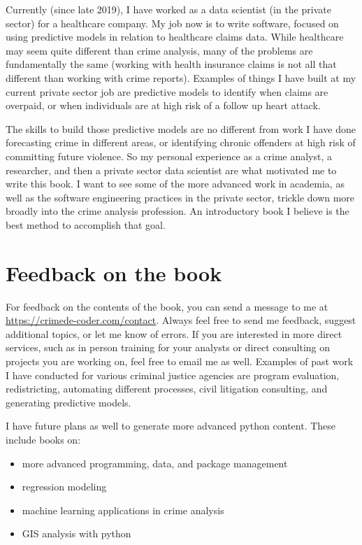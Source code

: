 \documentclass[
  letterpaper,
]{scrbook}
\providecommand{\tightlist}{%
  \setlength{\itemsep}{0pt}\setlength{\parskip}{0pt}}\usepackage{longtable,booktabs,array}
\begin{document}
Currently (since late 2019), I have worked as a data scientist (in the
private sector) for a healthcare company. My job now is to write
software, focused on using predictive models in relation to healthcare
claims data. While healthcare may seem quite different than crime
analysis, many of the problems are fundamentally the same (working with
health insurance claims is not all that different than working with
crime reports). Examples of things I have built at my current private
sector job are predictive models to identify when claims are overpaid,
or when individuals are at high risk of a follow up heart attack.

The skills to build those predictive models are no different from work I
have done forecasting crime in different areas, or identifying chronic
offenders at high risk of committing future violence. So my personal
experience as a crime analyst, a researcher, and then a private sector
data scientist are what motivated me to write this book. I want to see
some of the more advanced work in academia, as well as the software
engineering practices in the private sector, trickle down more broadly
into the crime analysis profession. An introductory book I believe is
the best method to accomplish that goal.

\section*{Feedback on the book}\label{feedback-on-the-book}


For feedback on the contents of the book, you can send a message to me
at \url{https://crimede-coder.com/contact}. Always feel free to send me
feedback, suggest additional topics, or let me know of errors. If you
are interested in more direct services, such as in person training for
your analysts or direct consulting on projects you are working on, feel
free to email me as well. Examples of past work I have conducted for
various criminal justice agencies are program evaluation, redistricting,
automating different processes, civil litigation consulting, and
generating predictive models.

I have future plans as well to generate more advanced python content.
These include books on:

\begin{itemize}
\tightlist
\item
  more advanced programming, data, and package management
\item
  regression modeling
\item
  machine learning applications in crime analysis
\item
  GIS analysis with python
\end{itemize}
\end{document}
